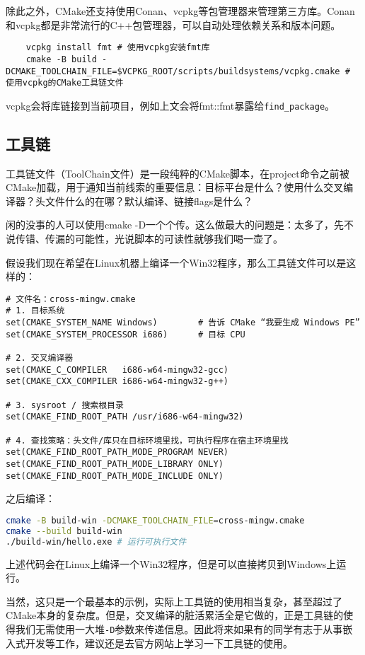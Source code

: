 \documentclass[../main.tex]{subfiles}
\begin{document}
除此之外，CMake还支持使用Conan、vcpkg等包管理器来管理第三方库。Conan和vcpkg都是非常流行的C++包管理器，可以自动处理依赖关系和版本问题。
\begin{lstlisting}
    vcpkg install fmt # 使用vcpkg安装fmt库
    cmake -B build -DCMAKE_TOOLCHAIN_FILE=$VCPKG_ROOT/scripts/buildsystems/vcpkg.cmake # 使用vcpkg的CMake工具链文件
\end{lstlisting}
vcpkg会将库链接到当前项目，例如上文会将fmt::fmt暴露给\texttt{find\_package}。

\subsection{工具链}

工具链文件（ToolChain文件）是一段纯粹的CMake脚本，在project命令之前被CMake加载，用于通知当前线索的重要信息：目标平台是什么？使用什么交叉编译器？头文件什么的在哪？默认编译、链接flags是什么？

闲的没事的人可以使用cmake -D一个个传。这么做最大的问题是：太多了，先不说传错、传漏的可能性，光说脚本的可读性就够我们喝一壶了。

假设我们现在希望在Linux机器上编译一个Win32程序，那么工具链文件可以是这样的：
\begin{lstlisting}
# 文件名：cross-mingw.cmake
# 1. 目标系统
set(CMAKE_SYSTEM_NAME Windows)        # 告诉 CMake “我要生成 Windows PE”
set(CMAKE_SYSTEM_PROCESSOR i686)      # 目标 CPU

# 2. 交叉编译器
set(CMAKE_C_COMPILER   i686-w64-mingw32-gcc)
set(CMAKE_CXX_COMPILER i686-w64-mingw32-g++)

# 3. sysroot / 搜索根目录
set(CMAKE_FIND_ROOT_PATH /usr/i686-w64-mingw32)

# 4. 查找策略：头文件/库只在目标环境里找，可执行程序在宿主环境里找
set(CMAKE_FIND_ROOT_PATH_MODE_PROGRAM NEVER)
set(CMAKE_FIND_ROOT_PATH_MODE_LIBRARY ONLY)
set(CMAKE_FIND_ROOT_PATH_MODE_INCLUDE ONLY)
\end{lstlisting}    
之后编译：
\begin{lstlisting}[language=bash]
cmake -B build-win -DCMAKE_TOOLCHAIN_FILE=cross-mingw.cmake
cmake --build build-win
./build-win/hello.exe # 运行可执行文件
\end{lstlisting}
上述代码会在Linux上编译一个Win32程序，但是可以直接拷贝到Windows上运行。

当然，这只是一个最基本的示例，实际上工具链的使用相当复杂，甚至超过了CMake本身的复杂度。但是，交叉编译的脏活累活全是它做的，正是工具链的使得我们无需使用一大堆\texttt{-D}参数来传递信息。因此将来如果有的同学有志于从事嵌入式开发等工作，建议还是去官方网站上学习一下工具链的使用。
\end{document}
